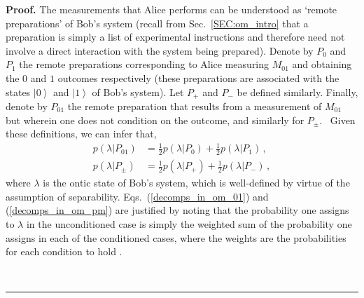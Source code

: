 \documentclass[aps,nofootinbib,12pt]{revtex4-2}
\newenvironment{proof}[1][Proof]{\noindent\textbf{#1.} }{\ \rule{0.5em}{0.5em}}
\begin{document}
\begin{proof}
The measurements that Alice performs can be understood as `remote
preparations' of Bob's system (recall from Sec.~\ref{SEC:om_intro}
that a preparation is simply a list of experimental instructions and
therefore need not involve a direct interaction with the system
being prepared). Denote by $P_{0}$ and $P_{1}$ the remote
preparations corresponding to Alice measuring $M_{01}$ and obtaining
the $0$ and $1$ outcomes respectively (these preparations are
associated with the states $\left\vert 0\right\rangle $ and
$\left\vert 1\right\rangle $ of Bob's system). Let $P_{+}$ and
$P_{-}$ be defined similarly. Finally, denote by $P_{01}$ the remote
preparation that results from a measurement of $M_{01}$ but wherein
one does not condition on the outcome, and similarly for $P_{\pm}.$
\ Given these definitions, we can infer that,
\begin{align}
p(\lambda|P_{01})  &
=\frac{1}{2}p(\lambda|P_{0})+\frac{1}{2}p(\lambda
|P_{1})\, ,\label{decomps_in_om_01}\\
p(\lambda|P_{\pm})  &
=\frac{1}{2}p(\lambda|P_{+})+\frac{1}{2}p(\lambda
|P_{-})\, ,\label{decomps_in_om_pm}%
\end{align}
where $\lambda$ is the ontic state of Bob's system, which is
well-defined by virtue of the assumption of separability.
Eqs.~(\ref{decomps_in_om_01}) and (\ref{decomps_in_om_pm}) are
justified by noting that the probability one assigns to $\lambda$ in
the unconditioned case is simply the weighted sum of the probability
one assigns in each of the conditioned cases, where the weights are
the probabilities for each condition to hold \cite{Spekkens_con}.


\end{proof}
\end{document}

